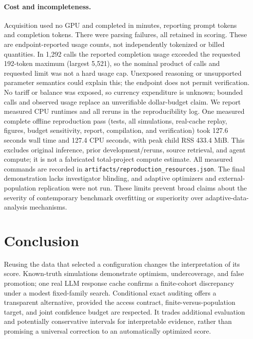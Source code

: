 \documentclass{article}
\begin{document}
\paragraph{Cost and incompleteness.}
Acquisition used no GPU and completed in \InferenceMinutes{} minutes, reporting \PromptTokens{} prompt tokens and \CompletionTokens{} completion tokens. There were \FormatFailures{} parsing failures, all retained in scoring. These are endpoint-reported usage counts, not independently tokenized or billed quantities. In 1,292 calls the reported completion usage exceeded the requested 192-token maximum (largest 5,521), so the nominal product of calls and requested limit was not a hard usage cap. Unexposed reasoning or unsupported parameter semantics could explain this; the endpoint does not permit verification. No tariff or balance was exposed, so currency expenditure is unknown; bounded calls and observed usage replace an unverifiable dollar-budget claim. We report measured CPU runtimes and all reruns in the reproducibility log. One measured complete offline reproduction pass (tests, all simulations, real-cache replay, figures, budget sensitivity, report, compilation, and verification) took 127.6 seconds wall time and 127.4 CPU seconds, with peak child RSS 433.4 MiB. This excludes original inference, prior development/reruns, source retrieval, and agent compute; it is not a fabricated total-project compute estimate. All measured commands are recorded in \texttt{artifacts/reproduction\_resources.json}. The final demonstration lacks investigator blinding, and adaptive optimizers and external-population replication were not run. These limits prevent broad claims about the severity of contemporary benchmark overfitting or superiority over adaptive-data-analysis mechanisms.

\section{Conclusion}
Reusing the data that selected a configuration changes the interpretation of its score. Known-truth simulations demonstrate optimism, undercoverage, and false promotion; one real LLM response cache confirms a finite-cohort discrepancy under a modest fixed-family search. Conditional exact auditing offers a transparent alternative, provided the access contract, finite-versus-population target, and joint confidence budget are respected. It trades additional evaluation and potentially conservative intervals for interpretable evidence, rather than promising a universal correction to an automatically optimized score.
\end{document}
